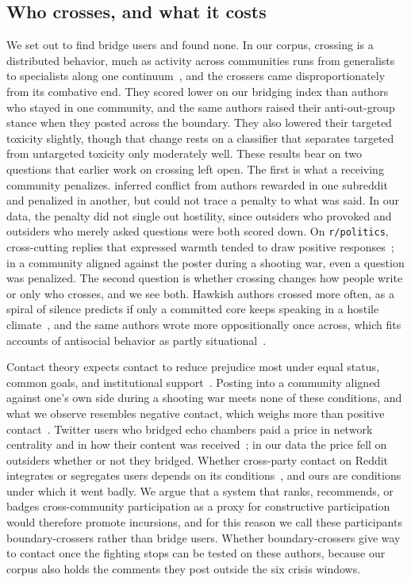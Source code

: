 \subsection{Who crosses, and what it costs}

We set out to find bridge users and found none. In our corpus, crossing is a distributed behavior, much as activity across communities runs from generalists to specialists along one continuum~\cite{waller2019generalists}, and the crossers came disproportionately from its combative end. They scored lower on our bridging index than authors who stayed in one community, and the same authors raised their anti-out-group stance when they posted across the boundary. They also lowered their targeted toxicity slightly, though that change rests on a classifier that separates targeted from untargeted toxicity only moderately well. These results bear on two questions that earlier work on crossing left open. The first is what a receiving community penalizes. \citet{datta2019interconflict} inferred conflict from authors rewarded in one subreddit and penalized in another, but could not trace a penalty to what was said. In our data, the penalty did not single out hostility, since outsiders who provoked and outsiders who merely asked questions were both scored down. On \texttt{r/politics}, cross-cutting replies that expressed warmth tended to draw positive responses~\cite{marchal2022benice}; in a community aligned against the poster during a shooting war, even a question was penalized. The second question is whether crossing changes how people write or only who crosses, and we see both. Hawkish authors crossed more often, as a spiral of silence predicts if only a committed core keeps speaking in a hostile climate~\cite{noelleneumann1974spiral}, and the same authors wrote more oppositionally once across, which fits accounts of antisocial behavior as partly situational~\cite{cheng2017troll}.

Contact theory expects contact to reduce prejudice most under equal status, common goals, and institutional support~\cite{pettigrew2006contact}. Posting into a community aligned against one's own side during a shooting war meets none of these conditions, and what we observe resembles negative contact, which weighs more than positive contact~\cite{paolini2010negative,barlow2012contact}. Twitter users who bridged echo chambers paid a price in network centrality and in how their content was received~\cite{garimella2018echo}; in our data the price fell on outsiders whether or not they bridged. Whether cross-party contact on Reddit integrates or segregates users depends on its conditions~\cite{xia2025integrated}, and ours are conditions under which it went badly. We argue that a system that ranks, recommends, or badges cross-community participation as a proxy for constructive participation would therefore promote incursions, and for this reason we call these participants boundary-crossers rather than bridge users. Whether boundary-crossers give way to contact once the fighting stops can be tested on these authors, because our corpus also holds the comments they post outside the six crisis windows. 



